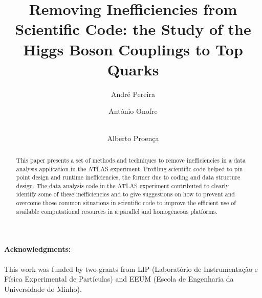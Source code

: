 \documentclass[runningheads,a4paper]{llncs}
\begin{document}
\title{Removing Inefficiencies from Scientific Code: the Study of the Higgs Boson Couplings to Top Quarks}




%
%
\author{André Pereira \and António Onofre  \and \\ Alberto Proença}
%



\maketitle              %

\begin{abstract}

This paper presents a set of methods and techniques to remove inefficiencies in a data analysis application in the ATLAS experiment. Profiling scientific code helped to pin point design and runtime inefficiencies, the former due to coding and data structure design. The data analysis code in the ATLAS experiment contributed to clearly identify some of these inefficiencies and to give suggestions on how to prevent and overcome those common situations in scientific code to improve the efficient use of available computational resources in a parallel and homogeneous platforms.

\end{abstract}
%








\paragraph{Acknowledgments:}

This work was funded by two grants from LIP (Laboratório de Instrumentação e Física Experimental de Partículas) and EEUM (Escola de Engenharia da Universidade do Minho).



\end{document}
